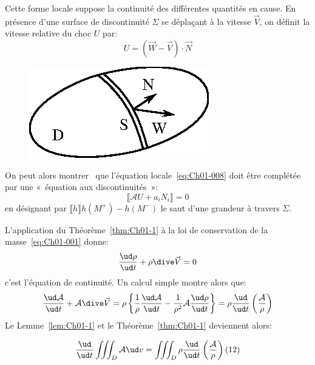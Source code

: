 Cette forme locale suppose la continuité des différentes quantités en cause.
En présence d'une surface de discontinuité $\Sigma$ se déplaçant à la vitesse $\vec{V}$, on définit la vitesse relative du choc $U$ par:
\begin{equation}
    U=(\vec{W}-\vec{V})\cdot \vec{N}
    \label{eq:Ch01-009}
\end{equation}
\begin{figure}
    \includegraphics{../images/T1_Ch01-0006}
\end{figure}
On peut alors montrer~\cite{Germain-73} que l'équation locale~\eqref{eq:Ch01-008} doit être complétée par une «~équation aux discontinuités~»:
\begin{equation}
    \llbracket\mathcal{A}U + a_iN_i\rrbracket = 0 
    \label{eq:Ch01-010}
\end{equation}
en désignant par $\llbracket h \rrbracket h(M^+)-h(M^-)$ le saut d'une grandeur à travers $\Sigma$.

L'application du Théorème~\ref{thm:Ch01-1} à la loi de conservation de la masse~\eqref{eq:Ch01-001} donne:
\begin{equation}
    \frac{\ud \rho}{\ud t}+\rho \dive \vec{V}=0
    \label{eq:Ch01-011}
\end{equation}
c'est l'équation de continuité.
Un calcul simple montre alors que:
\begin{equation*}
    \frac{\ud\mathcal{A}}{\ud t}+\mathcal{A}\dive \vec{V}=\rho\left\{\frac{1}{\rho}\frac{\ud \mathcal{A}}{\ud t}-\frac{1}{\rho^2}\mathcal{A}\frac{\ud \rho}{\ud t}\right\}=\rho \frac{\ud}{\ud t}\left(\frac{\mathcal{A}}{\rho}\right)
\end{equation*}
Le Lemme~\ref{lem:Ch01-1} et le Théorème~\ref{thm:Ch01-1} deviennent alors:
\begin{lem}
    \begin{equation}
        \frac{\ud}{\ud t}\iiint_D\mathcal{A}\ud v=\iiint_D\rho\frac{\ud}{\ud t}\left(\frac{\mathcal{A}}{\rho}\right)(12)
        \label{eq:Ch01-012}
    \end{equation}
    \label{lem:Ch01-1p}
\end{lem}

